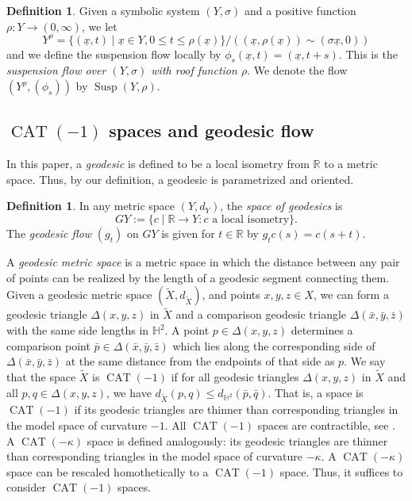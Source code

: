 \documentclass[JEP,XML,SOM,Unicode,NoFloatCountersInSection]{cedram}
\let\sep\mid
\theoremstyle{definition}
\newtheorem{defn}[thm]{Definition}
\numberwithin{equation}{section}
\DeclareMathOperator{\CAT}{CAT}
\DeclareMathOperator{\Susp}{Susp}
\begin{document}
\begin{defn}
Given a symbolic system $(Y, \sigma)$ and a positive function $\rho: Y \to (0,\infty)$, we let
\[
Y^{\rho} = \{ (\underline x,t)\sep \underline x\in Y, 0\leq t \leq \rho(\underline x) \}\big/((\underline x, \rho(\underline x))\sim(\sigma \underline x,0))\]
and we define the suspension flow locally by $\phi_s(\underline x, t) = (\underline x, t+s).$ This is the \emph{suspension flow over $(Y, \sigma)$ with roof function $\rho$}. We denote the flow $(Y^{\rho}, (\phi_s))$ by $\Susp(Y, \rho)$.
\end{defn}

\subsection{$\CAT(-1)$ spaces and geodesic flow}\label{subsec:CAT (-1)}

In this paper, a \emph{geodesic} is defined to be a local isometry from $\mathbb{R}$ to a metric space. Thus, by our definition, a geodesic is parametrized and oriented.

\begin{defn}
In any metric space $(Y,d_Y)$, the \emph{space of geodesics} is
\[ GY:= \{ c\sep\mathbb{R} \rightarrow Y : c \text{ a local isometry}\}.\]
The \emph{geodesic flow} $(g_t)$ on $GY$ is given for $t \in \mathbb R$ by $g_tc(s) = c(s+t)$.
\end{defn}

A \emph{geodesic metric space} is a metric space in which the distance between any pair of points can be realized by the length of a geodesic segment connecting them. Given a geodesic metric space $(\tilde X,d_{\tilde X})$, and points $x,y,z \in X$, we can form a geodesic triangle $\Delta(x,y,z)$ in $\tilde X$ and a comparison geodesic triangle $\Delta(\bar x, \bar y, \bar z)$ with the same side lengths in $\mathbb{H}^2$. A point $p \in \Delta(x,y,z)$ determines a comparison point $\bar p \in \Delta(\bar x, \bar y, \bar z)$ which lies along the corresponding side of $\Delta(\bar x, \bar y, \bar z)$ at the same distance from the endpoints of that side as $p$. We say that the space $\tilde X$ is $\CAT(-1)$ if for all geodesic triangles $\Delta(x,y,z)$ in $\tilde X$ and all $p,q \in \Delta(x,y,z)$, we have $d_{\tilde X}(p,q)\leq d_{\mathbb{H}^2}(\bar p, \bar q)$. That is, a space is $\CAT(-1)$ if its geodesic triangles are thinner than corresponding triangles in the model space of curvature $-1$. All $\CAT(-1)$ spaces are contractible, see \eg \cite[Chap.\,3, Props\,28 \&\,29]{troyanov}. A $\CAT(-\kappa)$ space is defined analogously: its geodesic triangles are thinner than corresponding triangles in the model space of curvature $-\kappa$. A $\CAT(- \kappa)$ space can be rescaled homothetically to a $\CAT(-1)$ space. Thus, it suffices to consider $\CAT(-1)$ spaces.
\end{document}

